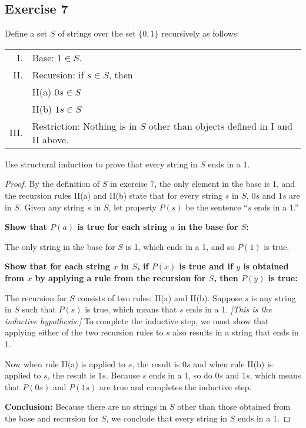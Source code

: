 \documentclass[14pt]{extarticle}
\begin{document}
\subsection{Exercise 7}
Define a set $S$ of strings over the set \(\{0, 1\}\) recursively as follows:

\begin{tabular}{rl}
    I.   & Base: $1 \in S$.                                                             \\
    II.  & Recursion: if $s \in S$, then                                                \\
         & II(a) $0s \in S$                                                             \\
         & II(b) $1s \in S$                                                             \\
    III. & Restriction: Nothing is in $S$ other than objects defined in I and II above.
\end{tabular}

Use structural induction to prove that every string in $S$ ends in a 1.

\begin{proof}
    By the definition of $S$ in exercise 7, the only element in the base is 1, and the recursion rules II(a) and II(b)
    state that for every string $s$ in $S$, $0s$ and $1s$ are in $S$. Given any string $s$ in $S$, let property $P(s)$ be
    the sentence “$s$ ends in a 1.”

    {\bf Show that $P(a)$ is true for each string $a$ in the base for $S$:}

    The only string in the base for $S$ is 1, which ends in a 1, and so $P(1)$ is true.

        {\bf Show that for each string $x$ in $S$, if $P(x)$ is true and if $y$ is obtained from $x$ by applying a rule
            from the recursion for $S$, then $P(y)$ is true:}

    The recursion for $S$ consists of two rules: II(a) and II(b). Suppose $s$ is any string in $S$ such that $P(s)$ is
    true, which means that $s$ ends in a 1. {\it [This is the inductive hypothesis.]} To complete the inductive step, we
    must show that applying either of the two recursion rules to $s$ also results in a string that ends in 1.

    Now when rule II(a) is applied to $s$, the result is $0s$ and when rule II(b) is applied to $s$, the result is $1s$.
    Because $s$ ends in a 1, so do $0s$ and $1s$, which means that $P(0s)$ and $P(1s)$ are true and completes the
    inductive step.

        {\bf Conclusion:} Because there are no strings in $S$ other than those obtained from the base and recursion for
    $S$, we conclude that every string in $S$ ends in a 1.
\end{proof}
\end{document}
